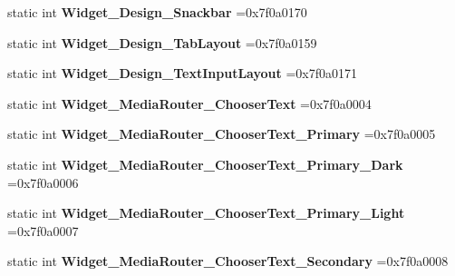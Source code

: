 \begin{DoxyCompactItemize}
static int {\bfseries Widget\+\_\+\+Design\+\_\+\+Snackbar} =0x7f0a0170
\item 
\mbox{\label{classandroid_1_1support_1_1design_1_1R_1_1style_a68859ceebc143f3d5bdbf89099380573}} 
static int {\bfseries Widget\+\_\+\+Design\+\_\+\+Tab\+Layout} =0x7f0a0159
\item 
\mbox{\label{classandroid_1_1support_1_1design_1_1R_1_1style_a5ca3baac2c9a5469b44281956cd5cd42}} 
static int {\bfseries Widget\+\_\+\+Design\+\_\+\+Text\+Input\+Layout} =0x7f0a0171
\item 
\mbox{\label{classandroid_1_1support_1_1design_1_1R_1_1style_ac94edf6e8f04bc9165eabdc13e1535de}} 
static int {\bfseries Widget\+\_\+\+Media\+Router\+\_\+\+Chooser\+Text} =0x7f0a0004
\item 
\mbox{\label{classandroid_1_1support_1_1design_1_1R_1_1style_a9221844d3e6c55f9d5e69a7a448d62a8}} 
static int {\bfseries Widget\+\_\+\+Media\+Router\+\_\+\+Chooser\+Text\+\_\+\+Primary} =0x7f0a0005
\item 
\mbox{\label{classandroid_1_1support_1_1design_1_1R_1_1style_a7648ee21a9af89d7917b689036047f33}} 
static int {\bfseries Widget\+\_\+\+Media\+Router\+\_\+\+Chooser\+Text\+\_\+\+Primary\+\_\+\+Dark} =0x7f0a0006
\item 
\mbox{\label{classandroid_1_1support_1_1design_1_1R_1_1style_a3cdfe5423c48ab04981173ed8888999a}} 
static int {\bfseries Widget\+\_\+\+Media\+Router\+\_\+\+Chooser\+Text\+\_\+\+Primary\+\_\+\+Light} =0x7f0a0007
\item 
\mbox{\label{classandroid_1_1support_1_1design_1_1R_1_1style_a4dd8d39ddef413e0d7e1414ee14079fe}} 
static int {\bfseries Widget\+\_\+\+Media\+Router\+\_\+\+Chooser\+Text\+\_\+\+Secondary} =0x7f0a0008
\item 
\mbox{\label{classandroid_1_1support_1_1design_1_1R_1_1style_a9f83a5e75d4358db600bfb11ac56e61b}} 

\end{DoxyCompactItemize}
